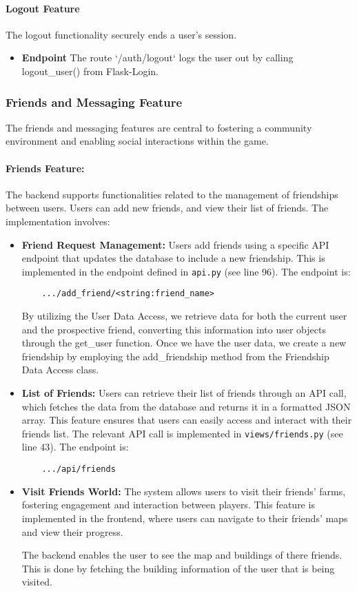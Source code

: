 \documentclass[12pt]{article}
\begin{document}
\paragraph{Logout Feature}
The logout functionality securely ends a user's session.
\begin{itemize}
    \item \textbf{Endpoint} The route `/auth/logout` logs the user out by calling logout\_user() from Flask-Login.
\end{itemize}
\subsubsection{Friends and Messaging Feature}
The friends and messaging features are central to fostering a community environment and enabling social interactions within the game.
\paragraph{Friends Feature:}
The backend supports functionalities related to the management of friendships between users. Users can add new friends, and view their list of friends. The implementation involves:
\begin{itemize}
    \item \textbf{Friend Request Management:} Users add friends using a specific API endpoint that updates the database to include a new friendship. This is implemented in the endpoint defined in \texttt{api.py} (see line 96). The endpoint is:
    \begin{verbatim}
    .../add_friend/<string:friend_name>
    \end{verbatim}
    By utilizing the User Data Access, we retrieve data for both the current user and the prospective friend, converting this information into user objects through the get\_user function. Once we have the user data, we create a new friendship by employing the add\_friendship method from the Friendship Data Access class.
    \item \textbf{List of Friends:} Users can retrieve their list of friends through an API call, which fetches the data from the database and returns it in a formatted JSON array. This feature ensures that users can easily access and interact with their friends list. The relevant API call is implemented in \texttt{views/friends.py} (see line 43). The endpoint is:
    \begin{verbatim}
    .../api/friends
    \end{verbatim}
    \item \textbf{Visit Friends World:} The system allows users to visit their friends' farms, fostering engagement and interaction between players. This feature is implemented in the frontend, where users can navigate to their friends' maps and view their progress.

    The backend enables the user to see the map and buildings of there friends. This is done by fetching the building information of the user that is being visited.
\end{itemize}
\end{document}
